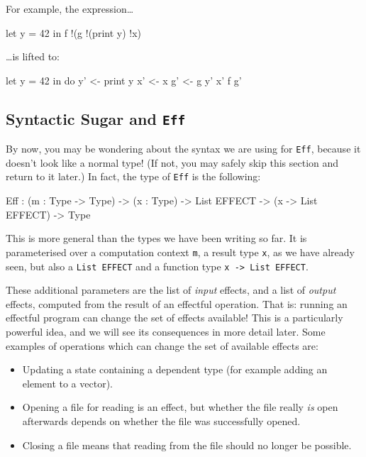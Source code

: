 For example, the expression\ldots

\begin{code}
let y = 42 in f !(g !(print y) !x) 
\end{code}

\ldots is lifted to:

\begin{code}
let y = 42 in do y' <- print y
                 x' <- x
                 g' <- g y' x'
                 f g'
\end{code}


\subsection{Syntactic Sugar and \texttt{Eff}}

By now, you may be wondering about the syntax we are using for \texttt{Eff},
because it doesn't look like a normal \Idris{} type! (If not, you may
safely skip this section and return to it later.) In fact, the type of
\texttt{Eff} is the following:

\begin{code}
Eff : (m : Type -> Type) ->
      (x : Type) ->
      List EFFECT -> (x -> List EFFECT) -> Type
\end{code}

\noindent
This is more general than the types we have been writing so far. It is
parameterised over a computation context \texttt{m}, a result type \texttt{x},
as we have already seen, but also a \texttt{List EFFECT} and a function type
\texttt{x -> List EFFECT}.

These additional parameters are the list of \emph{input} effects, and a list
of \emph{output} effects, computed from the result of an effectful operation.
That is: running an effectful program can change the set of effects available!
This is a particularly powerful idea, and we will see its consequences in more
detail later. Some examples of operations which can change the set of available
effects are:

\begin{itemize}
\item Updating a state containing a dependent type (for example adding an
element to a vector).
\item Opening a file for reading is an effect, but whether the file really
\emph{is} open afterwards depends on whether the file was successfully opened.
\item Closing a file means that reading from the file should no longer be
possible.
\end{itemize}

